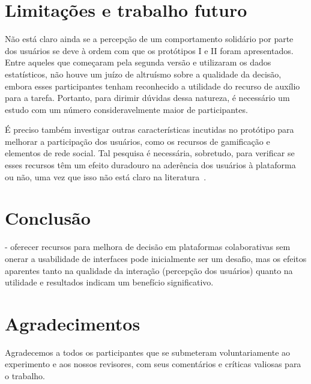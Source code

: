 \documentclass{sigchi}
\begin{document}
\section{Limitações e trabalho futuro}
Não está claro ainda se a percepção de um comportamento solidário por parte dos usuários se deve à ordem com que os protótipos I e II foram apresentados. Entre aqueles que começaram pela segunda versão e utilizaram os dados estatísticos, não houve um juízo de altruísmo sobre a qualidade da decisão, embora esses participantes tenham reconhecido a utilidade do recurso de auxílio para a tarefa. Portanto, para dirimir dúvidas dessa natureza, é necessário um estudo com um número consideravelmente maior de participantes.

É preciso também investigar outras características incutidas no protótipo para melhorar a participação dos usuários, como os recursos de gamificação e elementos de rede social. Tal pesquisa é necessária, sobretudo, para verificar se esses recursos têm um efeito duradouro na aderência dos usuários à plataforma ou não, uma vez que isso não está claro na literatura~\cite{hamari:2014}.


\section{Conclusão}
- oferecer recursos para melhora de decisão em plataformas colaborativas sem onerar a usabilidade de interfaces pode inicialmente ser um desafio, mas os efeitos aparentes tanto na qualidade da interação (percepção dos usuários) quanto na utilidade e resultados indicam um benefício significativo.


\section{Agradecimentos}

Agradecemos a todos os participantes que se submeteram voluntariamente ao experimento e aos nossos revisores, com seus comentários e críticas valiosas para o trabalho.


\balance{}


\balance{}



\end{document}
